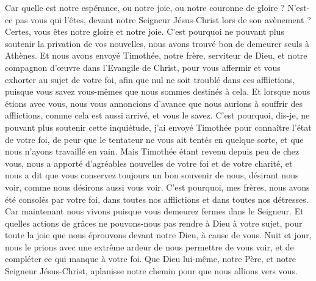 \begin{multicols}{2}
Car quelle est notre espérance, ou notre joie, ou notre couronne de gloire ? N'est-ce pas vous qui l'êtes, devant notre Seigneur Jésus-Christ lors de son avènement ?
Certes, vous êtes notre gloire et notre joie.
\VerseOne{}C'est pourquoi ne pouvant plus soutenir la privation de vos nouvelles, nous avons trouvé bon de demeurer seuls à Athènes.
Et nous avons envoyé Timothée, notre frère, serviteur de Dieu, et notre compagnon d'œuvre dans l'Evangile de Christ, pour vous affermir et vous exhorter au sujet de votre foi,
afin que nul ne soit troublé dans ces afflictions, puisque vous savez vous-mêmes que nous sommes destinés à cela.
Et lorsque nous étions avec vous, nous vous annoncions d'avance que nous aurions à souffrir des afflictions, comme cela est aussi arrivé, et vous le savez.
C'est pourquoi, dis-je, ne pouvant plus soutenir cette inquiétude, j'ai envoyé Timothée pour connaître l'état de votre foi, de peur que le tentateur ne vous ait tentés en quelque sorte, et que nous n'ayons travaillé en vain.
Mais Timothée étant revenu depuis peu de chez vous, nous a apporté d'agréables nouvelles de votre foi et de votre charité, et nous a dit que vous conservez toujours un bon souvenir de nous, désirant nous voir, comme nous désirons aussi vous voir.
C'est pourquoi, mes frères, nous avons été consolés par votre foi, dans toutes nos afflictions et dans toutes nos détresses.
Car maintenant nous vivons puisque vous demeurez fermes dans le Seigneur.
Et quelles actions de grâces ne pouvons-nous pas rendre à Dieu à votre sujet, pour toute la joie que nous éprouvons devant notre Dieu, à cause de vous.
Nuit et jour, nous le prions avec une extrême ardeur de nous permettre de vous voir, et de compléter ce qui manque à votre foi.
Que Dieu lui-même, notre Père, et notre Seigneur Jésus-Christ, aplanisse notre chemin pour que nous allions vers vous.

\end{multicols}
